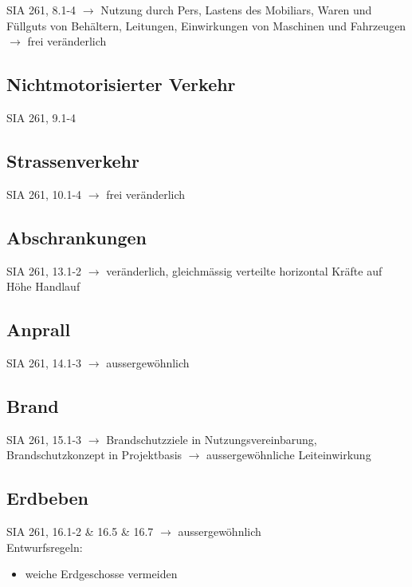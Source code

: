 \begin{multicols}{2}
			SIA 261, 8.1-4 $\rightarrow$ Nutzung durch Pers, Lastens des Mobiliars, Waren und Füllguts von Behältern, Leitungen, Einwirkungen von Maschinen und Fahrzeugen $\rightarrow$ frei veränderlich
			
			\subsection{Nichtmotorisierter Verkehr}
			
			SIA 261, 9.1-4
						
			\subsection{Strassenverkehr}
			
			SIA 261, 10.1-4 $\rightarrow$ frei veränderlich
			
			
			\subsection{Abschrankungen}
			
			SIA 261, 13.1-2 $\rightarrow$ veränderlich, gleichmässig verteilte horizontal Kräfte auf Höhe Handlauf
			
			
			\subsection{Anprall}
			
			SIA 261, 14.1-3 $\rightarrow$ aussergewöhnlich
			
			
				\subsection{Brand}
			
			SIA 261, 15.1-3 $\rightarrow$ Brandschutzziele in Nutzungsvereinbarung, Brandschutzkonzept in Projektbasis $\rightarrow$ aussergewöhnliche Leiteinwirkung
			
			
				\subsection{Erdbeben}
			
			SIA 261, 16.1-2 \& 16.5 \& 16.7 $\rightarrow$ aussergewöhnlich \\
			
			Entwurfsregeln:
				\begin{itemize}
					
					\item weiche Erdgeschosse vermeiden
					

\end{itemize}
\end{multicols}

